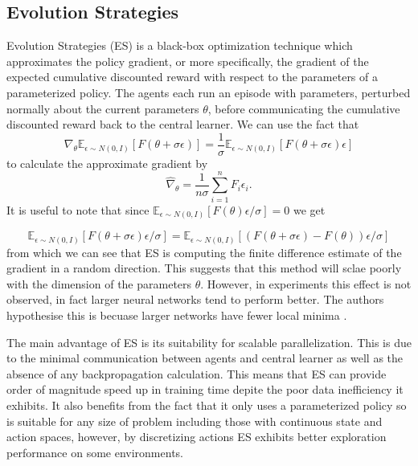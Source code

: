 \subsection{Evolution Strategies}
Evolution Strategies (ES) \cite{ES} is a black-box optimization technique which approximates the policy gradient, or more specifically, the gradient of the expected cumulative discounted reward with respect to the parameters of a parameterized policy.
The agents each run an episode with parameters, perturbed normally about the current parameters $\theta$, before communicating the cumulative discounted reward back to the central learner.
We can use the fact that
\begin{equation*}
        \nabla_\theta \mathbb{E}_{\epsilon \sim N(0,I)}[F(\theta+\sigma \epsilon)] = \frac{1}{\sigma}\mathbb{E}_{\epsilon \sim N(0,I)}[F(\theta+\sigma \epsilon) \epsilon]
\end{equation*}
to calculate the approximate gradient by
\begin{equation}
        \hat{\nabla}_\theta = \frac{1}{n\sigma}\sum^n_{i=1} F_i \epsilon_i.
        \label{eq:grad}
\end{equation}
It is useful to note that since $\mathbb{E}_{\epsilon \sim N(0,I)}[F(\theta)\epsilon/\sigma] = 0$ we get

\begin{equation*}
    \mathbb{E}_{\epsilon \sim N(0,I)}[F(\theta+\sigma \epsilon) \epsilon/\sigma] = \mathbb{E}_{\epsilon \sim N(0,I)}[(F(\theta+\sigma \epsilon) - F(\theta))\epsilon/\sigma]
\end{equation*}
from which we can see that ES is computing the finite difference estimate of the gradient in a random direction. This suggests that this method will sclae poorly with the dimension of the parameters $\theta$. However, in experiments this effect is not observed, in fact larger neural networks tend to perform better. The authors hypothesise this is becuase larger networks have fewer local minima \cite{LocalMinima}.

The main advantage of ES is its suitability for scalable parallelization. This is due to the minimal communication between agents and central learner as well as the absence of any backpropagation calculation. This means that ES can provide order of magnitude speed up in training time depite the poor data inefficiency it exhibits. It also benefits from the fact that it only uses a parameterized policy so is suitable for any size of problem including those with continuous state and action spaces, however, by discretizing actions ES exhibits better exploration performance on some environments.


